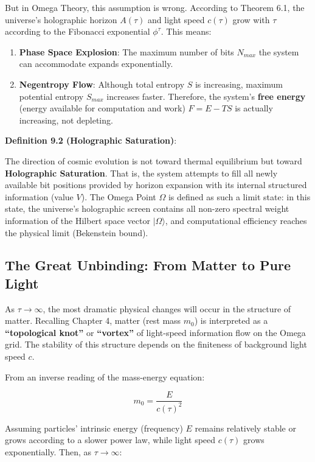 But in Omega Theory, this assumption is wrong.
According to Theorem 6.1, the universe's holographic horizon $A(\tau)$ and light speed $c(\tau)$ grow with $\tau$ according to the Fibonacci exponential $\phi^\tau$. This means:

\begin{enumerate}
\item \textbf{Phase Space Explosion}: The maximum number of bits $N_{max}$ the system can accommodate expands exponentially.
\item \textbf{Negentropy Flow}: Although total entropy $S$ is increasing, maximum potential entropy $S_{max}$ increases faster. Therefore, the system's \textbf{free energy} (energy available for computation and work) $F = E - TS$ is actually increasing, not depleting.
\end{enumerate}

\textbf{Definition 9.2 (Holographic Saturation)}:

The direction of cosmic evolution is not toward thermal equilibrium but toward \textbf{Holographic Saturation}. That is, the system attempts to fill all newly available bit positions provided by horizon expansion with its internal structured information (value $V$).
The Omega Point $\Omega$ is defined as such a limit state: in this state, the universe's holographic screen contains all non-zero spectral weight information of the Hilbert space vector $|\Omega\rangle$, and computational efficiency reaches the physical limit (Bekenstein bound).

\subsection{The Great Unbinding: From Matter to Pure Light}

As $\tau \to \infty$, the most dramatic physical changes will occur in the structure of matter.
Recalling Chapter 4, matter (rest mass $m_0$) is interpreted as a \textbf{``topological knot''} or \textbf{``vortex''} of light-speed information flow on the Omega grid. The stability of this structure depends on the finiteness of background light speed $c$.

From an inverse reading of the mass-energy equation:

\[m_0 = \frac{E}{c(\tau)^2}\]

Assuming particles' intrinsic energy (frequency) $E$ remains relatively stable or grows according to a slower power law, while light speed $c(\tau)$ grows exponentially. Then, as $\tau \to \infty$:

